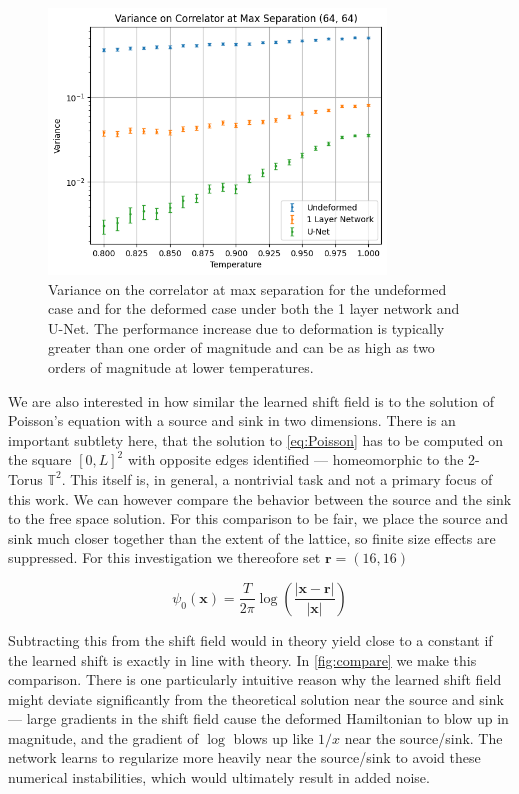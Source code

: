 \documentclass[12pt]{article}
\begin{document}
\begin{figure}[h!]
	\centering
	\includegraphics[width=0.8\textwidth]{figures/variance_temp.png}
	\caption[Variance vs. Temperature]{Variance on the correlator at max separation for the undeformed case and for the deformed
	case under both the 1 layer network and U-Net. The performance increase due to deformation is typically greater than one
	order of magnitude and can be as high as two orders of magnitude at lower temperatures.}
\end{figure}

We are also interested in how similar the learned shift field is to the solution of Poisson's equation with a source and sink in two dimensions.
There is an important subtlety here, that the solution to \ref{eq:Poisson} has to be computed on the square $[0,L]^2$ with opposite edges identified ---
homeomorphic to the 2-Torus $\mathbb{T}^2$. This itself is, in general, a nontrivial task and not a primary focus of this work. We can
however compare the behavior between the source and the sink to the free space solution. For this comparison to be fair, we place the source
and sink much closer together than the extent of the lattice, so finite size effects are suppressed. For this investigation we thereofore set $\mathbf{r}=(16, 16)$

\begin{equation} \label{eq:theory}
	\psi_0(\mathbf{x}) = \frac{T}{2\pi}\log\left(\frac{|\mathbf{x}-\mathbf{r}|}{|\mathbf{x}|}\right) 
\end{equation}

Subtracting this from the shift field would in theory yield close to a constant if the learned shift is exactly in line with theory. In \ref{fig:compare} 
we make this comparison. There is one particularly intuitive reason why the learned shift field might deviate significantly from the theoretical solution
near the source and sink --- large gradients in the shift field cause the deformed Hamiltonian to blow up in magnitude, and the gradient of $\log$ blows up like
$1/x$ near the source/sink. The network learns to regularize more heavily near the source/sink to avoid these numerical instabilities, which would ultimately result in added noise.
\end{document}
